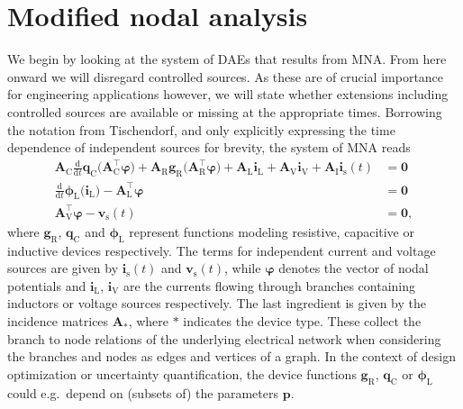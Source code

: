 \documentclass[AMA,STIX1COL]{WileyNJD-v2}
\newcommand{\mb}[1]{\mathbf{#1}}
\newcommand{\mr}[1]{\mathrm{#1}}
\newcommand{\T}{{\!\top}}
\newcommand{\ddt}{\frac{\mathrm{d}}{\mathrm{d}t}}
\newcommand{\A}[1]{\mb{A}_\mr{#1}}
\newcommand{\AT}[1]{\mb{A}_\mr{#1}^{\T}}
\newcommand{\qC}{\mb{q}_\mr{C}}
\newcommand{\gR}{\mb{g}_\mr{R}}
\newcommand{\phiL}{\boldsymbol{\phi}_\mr{L}}
\newcommand{\vphi}{\boldsymbol{\varphi}}
\renewcommand{\i}[1]{\mb{i}_\mr{#1}}
\renewcommand{\v}[1]{\mb{v}_\mr{#1}}
\begin{document}
\section{Modified nodal analysis}
\label{sec:mna}
We begin by looking at the system of DAEs that results from MNA. From here onward we will disregard controlled sources. As these are of crucial importance for engineering applications however, we will state whether extensions including controlled sources are available or missing at the appropriate times. Borrowing the notation from Tischendorf\cite{tischendorf1999}, and only explicitly expressing the time dependence of independent sources for brevity, the system of MNA reads
\begin{subequations}
    \label{eq:mnai}
    \begin{align}
            \A{C} \ddt \qC \big( \AT{C} \vphi \big) + \A{R} \gR \big( \AT{R} \vphi \big) + \A{L} \i{L} + \A{V} \i{V} + \A{I} \i{s}(t) &= \mb{0}\\ 
            \ddt \phiL \big( \i{L} \big) - \AT{L} \vphi &= \mb{0}\\
            \AT{V} \vphi - \v{s}(t)&= \mb{0},
    \end{align}
\end{subequations}
where $\gR$, $\qC$ and $\phiL$ represent functions modeling resistive, capacitive or inductive devices respectively. The terms for independent current and voltage sources are given by $\i{s}(t)$ and $\v{s}(t)$, while $\vphi$ denotes the vector of nodal potentials and $\i{L} $, $\i{V}$ are the currents flowing through branches containing inductors or voltage sources respectively. The last ingredient is given by the incidence matrices $\A{*}$, where $*$ indicates the device type. These collect the branch to node relations of the underlying electrical network when considering the branches and nodes as edges and vertices of a graph. In the context of design optimization or uncertainty quantification, the device functions $\gR$, $\qC$ or $\phiL$ could e.g.~depend on (subsets of) the parameters $\mb{p}$.
\end{document}

